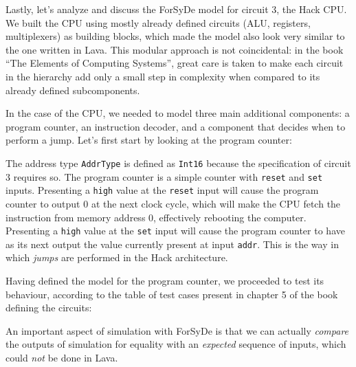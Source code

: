 \documentclass[a4paper]{article}
\begin{document}
                Lastly, let's analyze and discuss the ForSyDe model for circuit 3, the Hack CPU. We
                built the CPU using mostly already defined circuits (ALU, registers, multiplexers)
                as building blocks, which made the model also look very similar to the one written
                in Lava. This modular approach is not coincidental: in the book ``The Elements of
                Computing Systems''\cite{nand2tetris-book}, great care is taken to make each circuit
                in the hierarchy add only a small step in complexity when compared to its already
                defined subcomponents.

                In the case of the CPU, we needed to model three main additional components: a
                program counter, an instruction decoder, and a component that decides when to
                perform a jump. Let's first start by looking at the program counter:


                The address type \texttt{AddrType} is defined as \texttt{Int16} because the
                specification of circuit 3 requires so. The program counter is a simple counter with
                \texttt{reset} and \texttt{set} inputs. Presenting a \texttt{high} value at the
                \texttt{reset} input will cause the program counter to output 0 at the next clock
                cycle, which will make the CPU fetch the instruction from memory address 0,
                effectively rebooting the computer. Presenting a \texttt{high} value at the
                \texttt{set} input will cause the program counter to have as its next output the
                value currently present at input \texttt{addr}. This is the way in which
                \emph{jumps} are performed in the Hack architecture.

                Having defined the model for the program counter, we proceeded to test its
                behaviour, according to the table of test cases present in chapter
                5\cite{nand2tetris-chapter-cpu} of the book defining the circuits:


                An important aspect of simulation with ForSyDe is that we can actually
                \emph{compare} the outputs of simulation for equality with an \emph{expected}
                sequence of inputs, which could \emph{not} be done in Lava.
\end{document}
